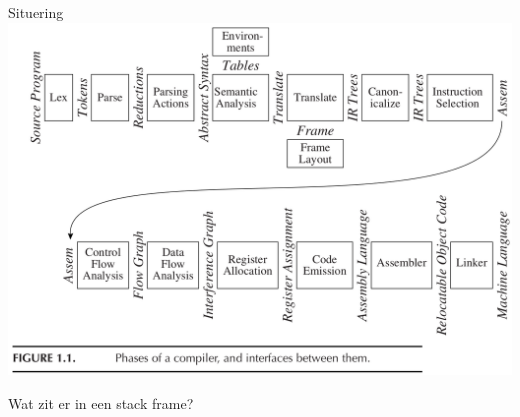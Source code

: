 \documentclass{beamer}
\begin{document}
\begin{frame}{Situering}
    \includegraphics[width=\textwidth]{compiler_phases.png}
\end{frame}


\begin{frame}
    Wat zit er in een stack frame?
\end{frame}
\end{document}
